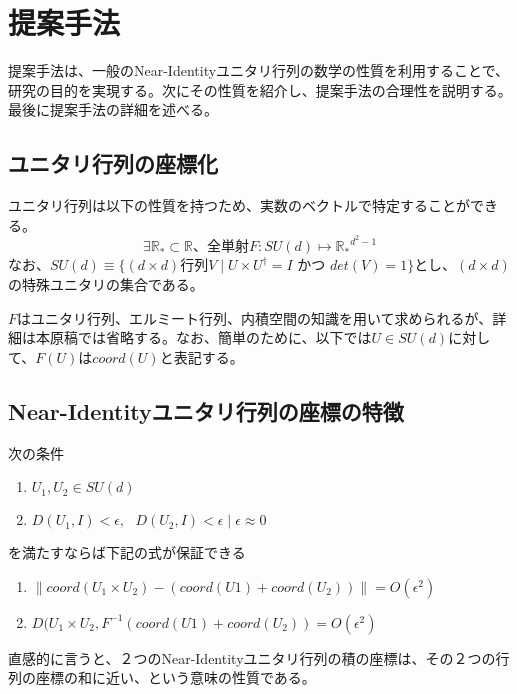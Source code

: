 \documentclass[9pt,a4paper,twocolumn]{jarticle}
\begin{document}
\section{提案手法}
提案手法は、一般のNear-Identityユニタリ行列の数学の性質を利用することで、研究の目的を実現する。次にその性質を紹介し、提案手法の合理性を説明する。最後に提案手法の詳細を述べる。

\subsection{ユニタリ行列の座標化}
ユニタリ行列は以下の性質を持つため、実数のベクトルで特定することができる。
\begin{equation}
\exists  \mathbb{R_*} \subset \mathbb{R}、 全単射 F: SU(d) \longmapsto \mathbb{R_*}^{d^2 - 1}
\end{equation}
なお、$SU(d)\equiv\lbrace (d \times d)行列V \mid U \times U^{\dagger} = I \text{ かつ } det(V) = 1 \rbrace $とし、$(d \times d)$の特殊ユニタリの集合である。

$F$はユニタリ行列、エルミート行列、内積空間の知識を用いて求められるが、詳細は本原稿では省略する。なお、簡単のために、以下では$U \in SU(d)$に対して、$F(U)$は$coord(U)$と表記する。

\subsection{Near-Identityユニタリ行列の座標の特徴}
次の条件
\begin{enumerate}
\item $U_1, U_2 \in SU(d)$
\item $D(U_1, I) < \epsilon,\text{ } D(U_2,I) < \epsilon \mid \epsilon \approx 0 $
\end{enumerate}

を満たすならば下記の式が保証できる
\begin{enumerate}
\item $\parallel coord(U_1 \times U_2) - (coord(U1) + coord(U_2)) \parallel = O(\epsilon ^ 2)$
\item $ D(U_1 \times U_2, F^{-1}(coord(U1) + coord(U_2)) = O(\epsilon ^ 2)$
\end{enumerate}
直感的に言うと、２つのNear-Identityユニタリ行列の積の座標は、その２つの行列の座標の和に近い、という意味の性質である。
\end{document}
